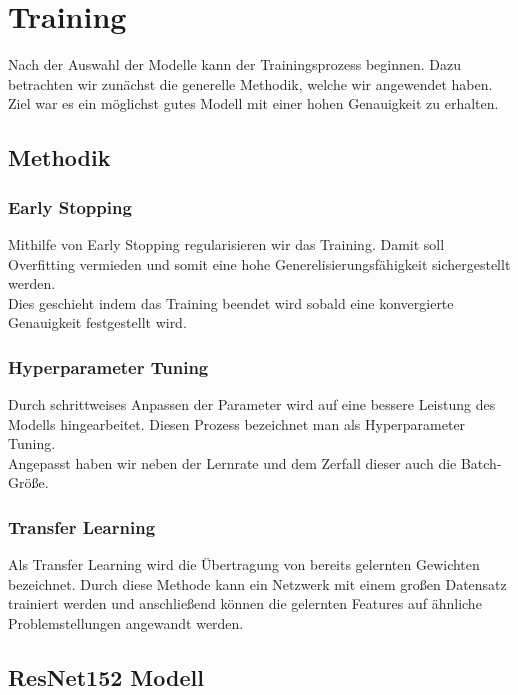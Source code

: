 \chapter{Training}
\label{ch:training}

Nach der Auswahl der Modelle kann der Trainingsprozess beginnen. Dazu betrachten wir zunächst die generelle Methodik, welche wir angewendet haben.
Ziel war es ein möglichst gutes Modell mit einer hohen Genauigkeit zu erhalten.

\section{Methodik}

\subsection{Early Stopping}

Mithilfe von Early Stopping regularisieren wir das Training. Damit soll Overfitting vermieden und somit eine hohe Generelisierungsfähigkeit sichergestellt werden.\\
Dies geschieht indem das Training beendet wird sobald eine konvergierte Genauigkeit festgestellt wird.

\subsection{Hyperparameter Tuning}

Durch schrittweises Anpassen der Parameter wird auf eine bessere Leistung des Modells hingearbeitet. Diesen Prozess bezeichnet man als Hyperparameter Tuning.\\
Angepasst haben wir neben der Lernrate und dem Zerfall dieser auch die Batch-Größe.

\subsection{Transfer Learning}

Als Transfer Learning wird die Übertragung von bereits gelernten Gewichten bezeichnet. Durch diese Methode kann ein Netzwerk mit einem großen Datensatz trainiert werden und anschließend können die gelernten Features auf ähnliche Problemstellungen angewandt werden.

\section{ResNet152 Modell}

